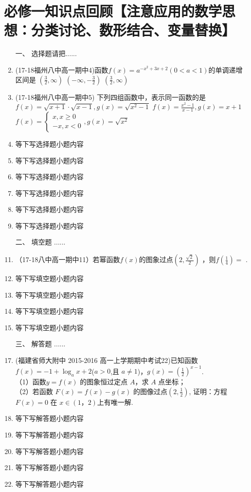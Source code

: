 \section{必修一知识点回顾【注意应用的数学思想：分类讨论、数形结合、变量替换】}
\begin{enumerate} 
        \item[一、] 选择题请把......
        \item (17-18福州八中高一期中4)函数$f(x)=a^{-x^2+3x+2}(0<a<1)$的单调递增区间是\xz
        {$(\frac32,\infty)$}
        {$(-\infty,-\frac32)$}
        {$(\frac32,\infty)$}

        \item  (17-18福州八中高一期中5) 下列四组函数中，表示同一函数的是\xz
        {$f(x)=\sqrt{x+1}\cdot\sqrt{x-1},g(x)=\sqrt{x^2-1}$}
        {$f(x)=\frac{x^2-1}{x-1},g(x)=x+1$}
        {$f(x)=\begin{cases}x,x\geq0\\-x,x<0\end{cases},g(x)=\sqrt{x^2}$}
        \item 等下写选择题小题内容 
        \item 等下写选择题小题内容 
        \item 等下写选择题小题内容 
        \item 等下写选择题小题内容 
        \item 等下写选择题小题内容 
        \item 等下写选择题小题内容 

        \item[二、] 填空题  ......
        \item （17-18八中高一期中11）若幂函数$f(x)$的图象过点$(2,\frac{\sqrt2}2)$ ，则$f(\frac14 )= $ \tk.
        \item 等下写填空题小题内容 
        \item 等下写填空题小题内容 
        \item 等下写填空题小题内容 
        \item 等下写填空题小题内容 

        \item[三、] 解答题  ......
        \item (福建省师大附中 2015-2016 高一上学期期中考试22)已知函数$f(x)=-1+\log_a{x+2}$($a>0$,且 $a \neq1$)，$g(x)=(\frac12)^{x-1}$.\\
（1）函数$ y= f (x )$ 的图象恒过定点 $A$，求 $A$ 点坐标；\\
（2）若函数 $F ( x )= f ( x )- g ( x )$ 的图像过点$(2,\frac12)$, 证明：方程 $F ( x )= 0$ 在 $x\in(1，2)$上有唯一解. 


        \item 等下写解答题小题内容 
        \item 等下写解答题小题内容 
        \item 等下写解答题小题内容 
        \item 等下写解答题小题内容 
        \item 等下写解答题小题内容 
\end{enumerate} 

